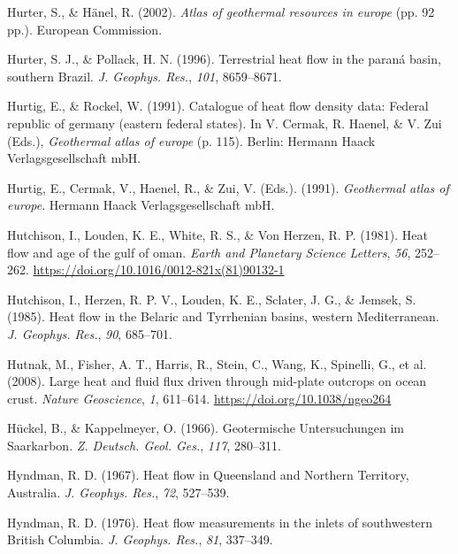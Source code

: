 \documentclass[draft,linenumbers]{agujournal2018}
\begin{document}
\leavevmode{}%
Hurter, S., \& Hänel, R. (2002). \emph{Atlas of geothermal resources in
europe} (pp. 92 pp.). European Commission.

\leavevmode{}%
Hurter, S. J., \& Pollack, H. N. (1996). Terrestrial heat flow in the
paran{á} basin, southern {Brazil}. \emph{J. Geophys. Res.}, \emph{101},
8659--8671.

\leavevmode{}%
Hurtig, E., \& Rockel, W. (1991). Catalogue of heat flow density data:
Federal republic of germany (eastern federal states). In V. Cermak, R.
Haenel, \& V. Zui (Eds.), \emph{Geothermal atlas of europe} (p. 115).
Berlin: Hermann Haack Verlagsgesellschaft mbH.

\leavevmode{}%
Hurtig, E., Cermak, V., Haenel, R., \& Zui, V. (Eds.). (1991).
\emph{Geothermal atlas of europe}. Hermann Haack Verlagsgesellschaft
mbH.

\leavevmode{}%
Hutchison, I., Louden, K. E., White, R. S., \& Von Herzen, R. P. (1981).
Heat flow and age of the gulf of oman. \emph{Earth and Planetary Science
Letters}, \emph{56}, 252--262.
\url{https://doi.org/10.1016/0012-821x(81)90132-1}

\leavevmode{}%
Hutchison, I., Herzen, R. P. V., Louden, K. E., Sclater, J. G., \&
Jemsek, S. (1985). Heat flow in the {Belaric and Tyrrhenian basins,
western Mediterranean}. \emph{J. Geophys. Res.}, \emph{90}, 685--701.

\leavevmode{}%
Hutnak, M., Fisher, A. T., Harris, R., Stein, C., Wang, K., Spinelli,
G., et al. (2008). Large heat and fluid flux driven through mid-plate
outcrops on ocean crust. \emph{Nature Geoscience}, \emph{1}, 611--614.
\url{https://doi.org/10.1038/ngeo264}

\leavevmode{}%
Hückel, B., \& Kappelmeyer, O. (1966). Geotermische {Untersuchungen im
Saarkarbon}. \emph{Z. Deutsch. Geol. Ges.}, \emph{117}, 280--311.

\leavevmode{}%
Hyndman, R. D. (1967). Heat flow in {Queensland and Northern Territory,
Australia}. \emph{J. Geophys. Res.}, \emph{72}, 527--539.

\leavevmode{}%
Hyndman, R. D. (1976). Heat flow measurements in the inlets of
southwestern {British Columbia}. \emph{J. Geophys. Res.}, \emph{81},
337--349.
\end{document}
